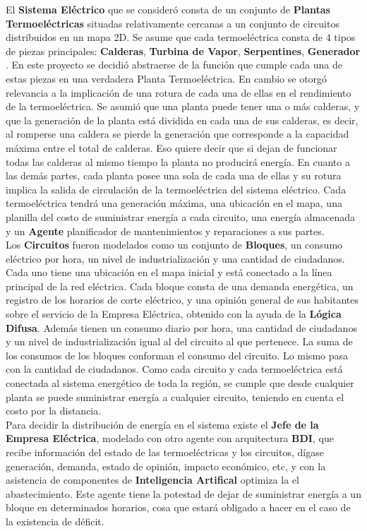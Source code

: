 \documentclass[twocolumn, fontsize=10pt]{article}
\begin{document}
El \textbf{Sistema Eléctrico} que se consideró consta de un conjunto de \textbf{Plantas Termoeléctricas}
situadas relativamente cercanas a un conjunto de circuitos distribuidos en un mapa 2D.
Se asume que cada termoeléctrica consta de 4 tipos de piezas principales:
\textbf{Calderas}, \textbf{Turbina de Vapor}, \textbf{Serpentines}, \textbf{Generador} \cite{parts}.
En este proyecto se decidió abstraerse de la función que cumple cada una de estas piezas
en una verdadera Planta Termoeléctrica. En cambio se otorgó relevancia a la implicación de
una rotura de cada una de ellas en el rendimiento de la termoeléctrica. Se asumió que una planta
 puede tener una o más calderas, y que la generación de la planta está dividida en cada una de sus calderas,
 es decir, al romperse una caldera se pierde la generación que corresponde a la capacidad máxima entre el total
 de calderas. Eso quiere decir que si dejan de funcionar todas las calderas al mismo tiempo la planta no producirá energía.
 En cuanto a las demás partes, cada planta posee una sola de cada una de ellas y su rotura implica la salida de circulación
 de la termoeléctrica del sistema eléctrico. Cada termoeléctrica tendrá una generación máxima, una ubicación en el mapa,
 una planilla del costo de suministrar energía a cada circuito, una energía almacenada y un \textbf{Agente} planificador de
 mantenimientos y reparaciones a sus partes.\\
 Los \textbf{Circuitos} fueron modelados como un conjunto de \textbf{Bloques}, un consumo eléctrico por hora, 
 un nivel de industrialización y una cantidad de ciudadanos. Cada uno tiene una ubicación en el mapa inicial y está conectado 
 a la línea principal de la red eléctrica. Cada bloque consta de una demanda energética, un registro de los horarios de corte 
 eléctrico, y una opinión general de sus habitantes sobre el servicio de la Empresa Eléctrica, obtenido con la ayuda de la \textbf{Lógica Difusa}. 
 Además tienen un consumo diario por hora, una cantidad de ciudadanos y un nivel de industrialización igual
 al del circuito al que pertenece. La suma de los consumos de los bloques conforman el consumo del circuito. 
 Lo mismo pasa con la cantidad de ciudadanos. Como cada circuito y cada termoeléctrica
 está conectada al sistema energético de toda la región, se cumple que desde cualquier planta se puede suministrar
 energía a cualquier circuito, teniendo en cuenta el costo por la distancia.\\
 Para decidir la distribución de energía en el sistema existe el \textbf{Jefe de la Empresa Eléctrica}, modelado con otro agente
 con arquitectura \textbf{BDI}, que recibe información del estado de las termoeléctricas y los circuitos, dígase generación, demanda, estado de opinión,
 impacto económico, etc, y con la asistencia de componentes de \textbf{Inteligencia Artifical} optimiza la el abastecimiento. Este agente
 tiene la potestad de dejar de suministrar energía a un bloque en determinados horarios, cosa que estará obligado a hacer en el caso de la 
 existencia de déficit.
\end{document}
